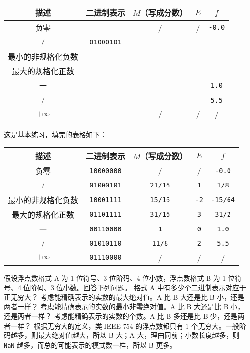 \begin{problems}
		\begin{table}[H]
			\centering
			\begin{tabular}{|c|c|c|c|c|}
				\hline
				描述 & 二进制表示 & $M$（写成分数） & $E$ & $f$ \\ \hline
				负零 &  & / & / & \texttt{-0.0} \\ \hline
				/ & \verb|01000101| &  &  &  \\ \hline
				最小的非规格化负数 &  &  &  &  \\ \hline
				最大的规格化正数 &  &  &  &  \\ \hline
				一 &  &  &  & \texttt{1.0} \\ \hline
				/ &  &  &  & \texttt{5.5} \\ \hline
				$+\infty$ &  & / & / & / \\ \hline
			\end{tabular}
		\end{table}
		\sol 这是基本练习，填完的表格如下：
		\begin{table}[H]
			\centering
			\begin{tabular}{|c|c|c|c|c|}
				\hline
				描述 & 二进制表示 & $M$（写成分数） & $E$ & $f$ \\ \hline
				负零 & \verb|10000000| & / & / & \texttt{-0.0} \\ \hline
				/ & \verb|01000101| & \verb|21/16| & \verb|1| & \verb|1/8| \\ \hline
				最小的非规格化负数 & \verb|10001111| & \verb|15/16| & \verb|-2| & \verb|-15/64| \\ \hline
				最大的规格化正数 & \verb|01101111| & \verb|31/16| & \verb|3| & \verb|31/2| \\ \hline
				一 & \verb|00110000| & \verb|1| & \verb|0| & \texttt{1.0} \\ \hline
				/ & \verb|01010110| & \verb|11/8| & \verb|2| & \texttt{5.5} \\ \hline
				$+\infty$ & \verb|01110000| & / & / & / \\ \hline
			\end{tabular}
		\end{table}
		\pro 假设浮点数格式 A 为 1 位符号、3 位阶码、4 位小数，浮点数格式 B 为 1 位符号、4 位阶码、3 位小数。回答下列问题。
			\qn 格式 A 中有多少个二进制表示对应于正无穷大？
			\qn 考虑能精确表示的实数的最大绝对值。A 比 B 大还是比 B 小，还是两者一样？
			\qn 考虑能精确表示的实数的最小非零绝对值。A 比 B 大还是比 B 小，还是两者一样？
			\qn 考虑能精确表示的实数的个数。A 比 B 多还是比 B 少，还是两者一样？
		\sol 根据无穷大的定义，类 IEEE 754 的浮点数都只有 1 个无穷大。一般阶码越多，则最大绝对值越大，所以 B 大；A 大，理由同前；小数长度越多，则 \verb|NaN| 越多，而总的可能表示的模式数一样，所以 B 更多。

\end{problems}

